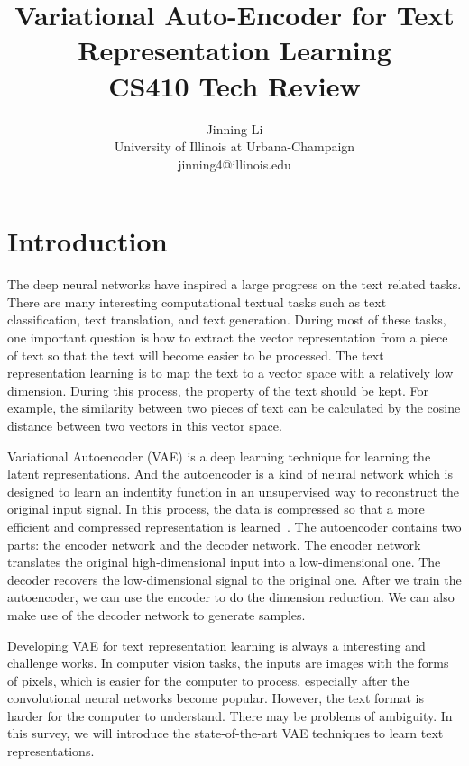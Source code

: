 \documentclass{article}
\title{Variational Auto-Encoder for Text Representation Learning \\\Large{CS410 Tech Review}}
\author{Jinning Li\\
{\small University of Illinois at Urbana-Champaign}\\
{\small jinning4@illinois.edu}}
\date{}
\begin{document}
\maketitle

\section{Introduction}
The deep neural networks have inspired a large progress on the text related tasks. There are many interesting computational textual tasks such as text classification, text translation, and text generation. During most of these tasks, one important question is how to extract the vector representation from a piece of text so that the text will become easier to be processed. The text representation learning is to map the text to a vector space with a relatively low dimension. During this process, the property of the text should be kept. For example, the similarity between two pieces of text can be calculated by the cosine distance between two vectors in this vector space.

Variational Autoencoder (VAE) is a deep learning technique for learning the latent representations. And the autoencoder is a kind of neural network which is designed to learn an indentity function in an unsupervised way to reconstruct the original input signal. In this process, the data is compressed so that a more efficient and compressed representation is learned~\cite{hinton2006reducing}. The autoencoder contains two parts: the encoder network and the decoder network. The encoder network translates the original high-dimensional input into a low-dimensional one. The decoder recovers the low-dimensional signal to the original one. After we train the autoencoder, we can use the encoder to do the dimension reduction. We can also make use of the decoder network to generate samples.

Developing VAE for text representation learning is always a interesting and challenge works. In computer vision tasks, the inputs are images with the forms of pixels, which is easier for the computer to process, especially after the convolutional neural networks become popular. However, the text format is harder for the computer to understand. There may be problems of ambiguity. In this survey, we will introduce the state-of-the-art VAE techniques to learn text representations.
\end{document}
